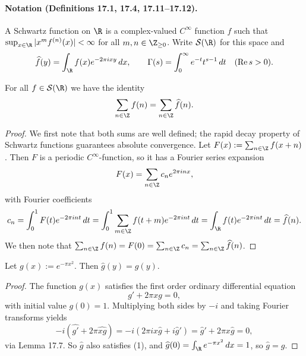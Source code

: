 \paragraph{Notation (Definitions 17.1, 17.4, 17.11--17.12).}
A Schwartz function on $\R$ is a complex-valued $C^\infty$ function $f$ such that $\sup_{x\in\R}|x^m f^{(n)}(x)|<\infty$ for all $m,n\in\Z_{\geq0}$. Write $\mathcal S(\R)$ for this space and
\[
\widehat f(y)=\int_\R f(x)e^{-2\pi ixy}\,dx,\qquad
\Gamma(s)=\int_0^\infty e^{-t}t^{s-1}\,dt\quad(\operatorname{Re}s>0).
\]
\begin{theorem}
For all $f\in\mathcal S(\R)$ we have the identity
\[
\sum_{n\in\Z}f(n)=\sum_{n\in\Z}\widehat f(n).
\]
\end{theorem}
\begin{proof}
We first note that both sums are well defined; the rapid decay property of Schwartz functions guarantees absolute convergence. Let $F(x):=\sum_{n\in\Z}f(x+n)$. Then $F$ is a periodic $C^\infty$-function, so it has a Fourier series expansion
\[
F(x)=\sum_{n\in\Z}c_ne^{2\pi inx},
\]
with Fourier coefficients
\[
c_n=\int_0^1 F(t)e^{-2\pi int}\,dt
=\int_0^1\sum_{m\in\Z}f(t+m)e^{-2\pi int}\,dt
=\int_\R f(t)e^{-2\pi int}\,dt=\widehat f(n).
\]
We then note that $\sum_{n\in\Z}f(n)=F(0)=\sum_{n\in\Z}c_n=\sum_{n\in\Z}\widehat f(n)$.
\end{proof}
\begin{lemma}[17.9]
Let $g(x):=e^{-\pi x^2}$. Then $\widehat g(y)=g(y)$.
\end{lemma}
\begin{proof}
The function $g(x)$ satisfies the first order ordinary differential equation
\[
g'+2\pi xg=0,\tag{1}
\]
with initial value $g(0)=1$. Multiplying both sides by $-i$ and taking Fourier transforms yields
\[
-i(\widehat {g'}+2\pi\widehat{xg})=-i(2\pi ix\widehat g+i\widehat g')=\widehat g'+2\pi x\widehat g=0,
\]
via Lemma 17.7. So $\widehat g$ also satisfies (1), and $\widehat g(0)=\int_\R e^{-\pi x^2}\,dx=1$, so $\widehat g=g$.
\end{proof}

